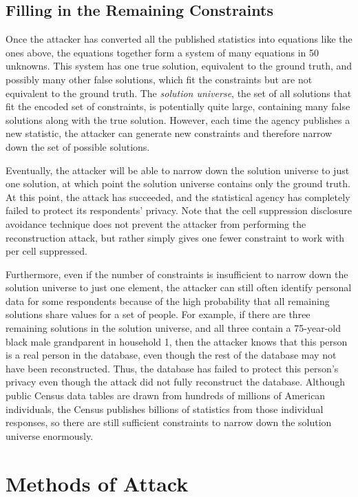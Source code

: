\documentclass[runningheads]{llncs}
\begin{document}
\subsection{Filling in the Remaining Constraints}
Once the attacker has converted all the published statistics
into equations like the ones above, the equations together form a system of many equations in 50 unknowns. This system has one true solution, equivalent to the
ground truth, and possibly many other false solutions, which fit the constraints but are not equivalent to the ground truth.
The \textit{solution universe}, the set of all solutions that fit the encoded set of constraints, is potentially quite large, containing many false solutions along with the true solution.
However, each time the agency publishes a new statistic, the attacker can generate new constraints and therefore narrow
down the set of possible solutions.

Eventually, the attacker
will be able to narrow down the solution universe to just one solution, at which point the solution universe contains only
the ground truth. At this point, the attack has succeeded, and the statistical agency has completely failed to protect its respondents' privacy. Note that the cell suppression disclosure avoidance technique does not prevent the attacker from performing the reconstruction attack, but rather simply gives one fewer constraint to work with per cell suppressed.

Furthermore, even if the number of constraints is insufficient to narrow down the solution universe to just one element, the attacker can still often identify personal data for some respondents because of the high probability that all remaining solutions share values for a set of people. For example, if there are three remaining solutions in the solution universe, and all three contain a 75-year-old black male grandparent in household 1, then the attacker knows that this person is a real person in the database, even though the rest of the database may not have been reconstructed. Thus, the database has failed to protect this person's privacy even though the attack did not fully reconstruct the database.
Although public Census data tables are drawn from hundreds of millions of American individuals, the Census publishes billions of statistics from those individual responses, so there are still sufficient constraints to narrow down the solution universe enormously.


\section{Methods of Attack}
\end{document}
